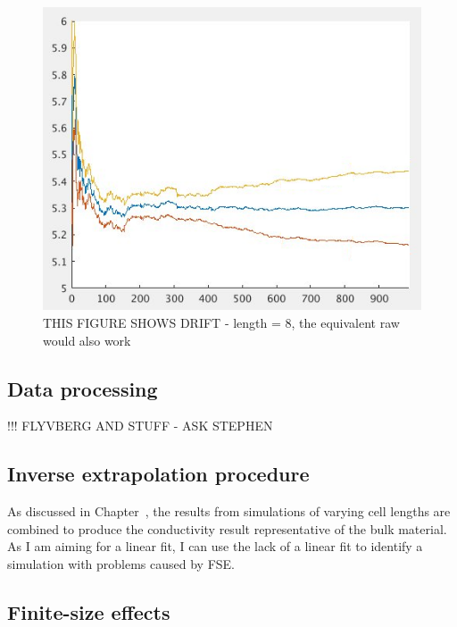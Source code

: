 \begin{figure}[h!]
\includegraphics[width=\linewidth]{Figures/direct_trim_drift_4000_2x2.png}
\caption[direct conv]{THIS FIGURE SHOWS DRIFT - length = 8, the equivalent raw would also work}
\label{fig:direct_drift}
\end{figure}


\subsection{\label{sec:3.DM.data}Data processing}

!!! FLYVBERG AND STUFF - ASK STEPHEN


\subsection{\label{sec:3.DM.extrap}Inverse extrapolation procedure}

As discussed in Chapter~\label{chp2.schelling}, the results from simulations of varying cell lengths are combined to produce the conductivity result representative of the bulk material. As I am aiming for a linear fit, I can use the lack of a linear fit to identify a simulation with problems caused by FSE.

\subsection{\label{sec:3.DM.fse}Finite-size effects}

